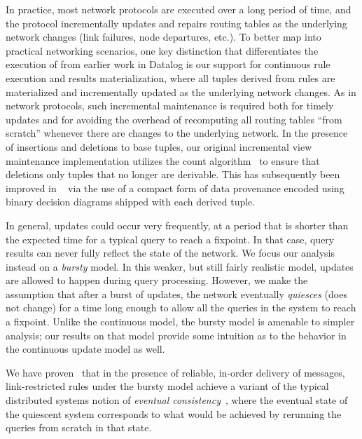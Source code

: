 In practice, most network protocols are executed over a long period of
time, and the protocol incrementally updates and repairs routing
tables as the underlying network changes (link failures, node
departures, etc.).  To better map into practical networking scenarios,
one key distinction that differentiates the execution of \Dlog from
earlier work in Datalog is our support for continuous rule execution
and results materialization, where all tuples derived from \Dlog rules
are materialized and incrementally updated as the underlying network
changes. As in network protocols, such incremental maintenance is
required both for timely updates and for avoiding the overhead of
recomputing all routing tables ``from scratch'' whenever there are
changes to the underlying network. In the presence of insertions and
deletions to base tuples, our original incremental view maintenance
implementation utilizes the count algorithm~\cite{viewincremental} to
ensure that deletions only tuples that no longer are derivable. This
has subsequently been improved in ~\cite{absorption} via the use of a
compact form of data provenance encoded using binary decision diagrams
shipped with each derived tuple.

In general, updates could occur very frequently, at a period that is
shorter than the expected time for a typical query to reach a
fixpoint.  In that case, query results can never fully reflect the
state of the network. We focus our analysis instead on a {\em bursty}
model. In this weaker, but still fairly realistic model, updates are
allowed to happen during query processing.  However, we make the
assumption that after a burst of updates, the network eventually {\em
  quiesces} (does not change) for a time long enough to allow all the
queries in the system to reach a fixpoint.  Unlike the continuous
model, the bursty model is amenable to simpler analysis; our results
on that model provide some intuition as to the behavior in the
continuous update model as well.

We have proven~\cite{declareNetworks} that in the presence of
reliable, in-order delivery of messages, link-restricted \Dlog rules
under the bursty model achieve a variant of the typical distributed
systems notion of {\em eventual consistency}~\cite{FekGLLS99}, where
the eventual state of the quiescent system corresponds to what would
be achieved by rerunning the queries from scratch in that state.  







